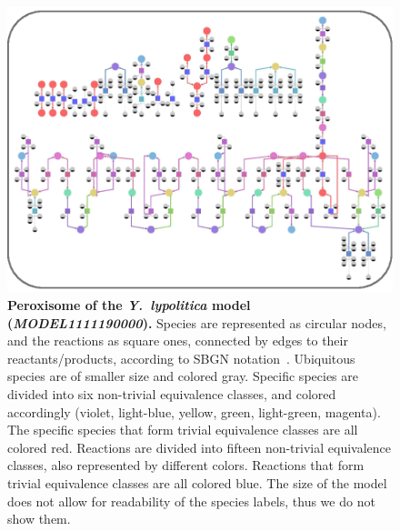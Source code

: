 \documentclass[9pt]{article}
\newcounter{fig}
\newcounter{rm}
\begin{document}
\begin{figure}[th]
\centerline{\includegraphics{../pics/Zhukova_Fig_2.eps}}
\vspace*{8pt}
\caption{\textbf{Peroxisome of the \textit{Y.~lypolitica} model (\emph{MODEL1111190000}).} Species are represented as circular nodes, and the reactions as square ones, connected by edges to their reactants/products, according to SBGN notation~\citep{Moodie2011}. Ubiquitous species are of smaller size and colored gray. Specific species are divided into six non-trivial equivalence classes, and colored accordingly (violet, light-blue, yellow, green, light-green, magenta). The specific species that form trivial equivalence classes are all colored red. Reactions are divided into fifteen non-trivial equivalence classes, also represented by different colors. Reactions that form trivial equivalence classes are all colored blue.       
      The size of the model does not allow for readability of the species labels, thus we do not show them.}
\label{fig:bf}
\end{figure}
\end{document}
